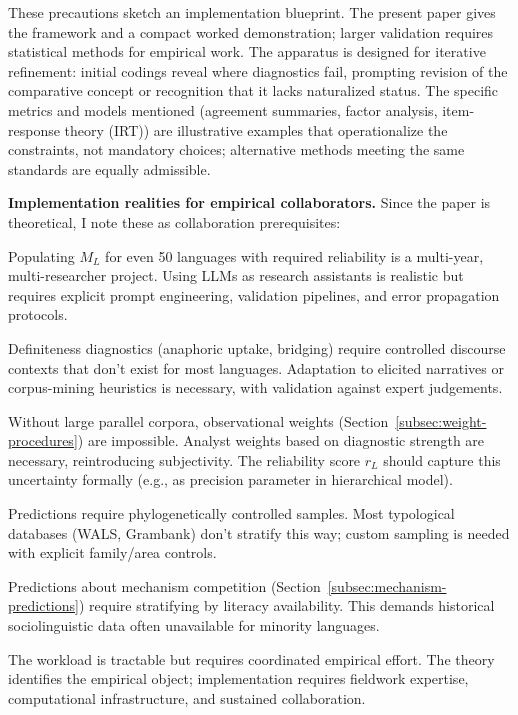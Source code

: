 \documentclass[12pt]{article}
\begin{document}
These precautions sketch an implementation blueprint. The present paper gives the framework and a compact worked demonstration; larger validation requires statistical methods for empirical work. The apparatus is designed for iterative refinement: initial codings reveal where diagnostics fail, prompting revision of the comparative concept or recognition that it lacks naturalized status. The specific metrics and models mentioned (agreement summaries, factor analysis, item-response theory (IRT)) are illustrative examples that operationalize the constraints, not mandatory choices; alternative methods meeting the same standards are equally admissible.

\textbf{Implementation realities for empirical collaborators.}\label{subsec:implementation} Since the paper is theoretical, I note these as collaboration prerequisites:

Populating $M_L$ for even 50 languages with required reliability is a multi-year, multi-researcher project. Using LLMs as research assistants is realistic but requires explicit prompt engineering, validation pipelines, and error propagation protocols.

Definiteness diagnostics (anaphoric uptake, bridging) require controlled discourse contexts that don't exist for most languages. Adaptation to elicited narratives or corpus-mining heuristics is necessary, with validation against expert judgements.

Without large parallel corpora, observational weights (Section~\ref{subsec:weight-procedures}) are impossible. Analyst weights based on diagnostic strength are necessary, reintroducing subjectivity. The reliability score $r_L$ should capture this uncertainty formally (e.g., as precision parameter in hierarchical model).

Predictions require phylogenetically controlled samples. Most typological databases (WALS, Grambank) don't stratify this way; custom sampling is needed with explicit family/area controls.

Predictions about mechanism competition (Section~\ref{subsec:mechanism-predictions}) require stratifying by literacy availability. This demands historical sociolinguistic data often unavailable for minority languages.

The workload is tractable but requires coordinated empirical effort. The theory identifies the empirical object; implementation requires fieldwork expertise, computational infrastructure, and sustained collaboration.
\end{document}
